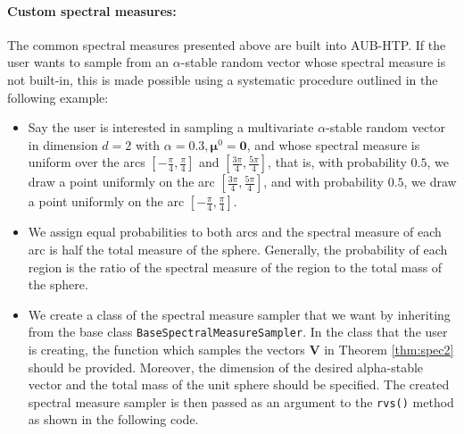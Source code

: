 \paragraph{Custom spectral measures:} The common spectral measures presented above are built into AUB-HTP. If the user wants to sample from an $\alpha$-stable random vector whose spectral measure is not built-in, this is made possible using a systematic procedure outlined in the following example:
\begin{itemize}

\item Say the user is interested in sampling a multivariate $\alpha$-stable random vector in dimension $d=2$ with $\alpha=0.3, \boldsymbol{\mu}^0=\mathbf{0}$, and whose spectral measure is uniform over the arcs $\left[-\frac{\pi}{4},\frac{\pi}{4}\right]$ and $\left[\frac{3\pi}{4},\frac{5\pi}{4}\right]$, that is, with probability $0.5$, we  draw a point uniformly on the arc $\left[\frac{3\pi}{4},\frac{5\pi}{4}\right]$, and with probability $0.5$, we draw a point uniformly on the arc $\left[-\frac{\pi}{4},\frac{\pi}{4}\right]$.

\item We assign equal probabilities to both arcs and the spectral measure of each arc is half the total measure of the sphere. Generally, the probability of each region is the ratio of the spectral measure of the region to the total mass of the sphere.

\item We create a class of the spectral measure sampler that we want by inheriting from the base class \texttt{BaseSpectralMeasureSampler}. In the class that the user is creating, the function which samples the vectors $\mathbf{V}$ in Theorem \ref{thm:spec2} should be provided. Moreover, the dimension of the desired alpha-stable vector and the total mass of the unit sphere should be specified. The created spectral measure sampler is then passed as an argument to the \texttt{rvs()} method as shown in the following code.
\end{itemize}

